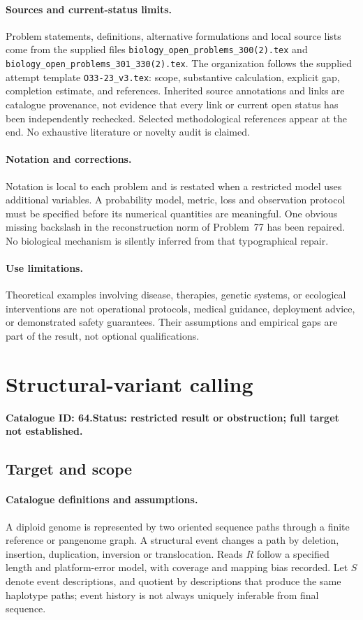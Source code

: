 \documentclass[11pt]{article}
\begin{document}
\paragraph{Sources and current-status limits.}
Problem statements, definitions, alternative formulations and local source lists
come from the supplied files
\texttt{biology\_open\_problems\_300(2).tex} and
\texttt{biology\_open\_problems\_301\_330(2).tex}.
The organization follows the supplied attempt template
\texttt{O33-23\_v3.tex}: scope, substantive calculation, explicit gap,
completion estimate, and references. Inherited source annotations and links are
catalogue provenance, not evidence that every link or current open status has
been independently rechecked. Selected methodological references appear at the
end. No exhaustive literature or novelty audit is claimed.

\paragraph{Notation and corrections.}
Notation is local to each problem and is restated when a restricted model uses
additional variables. A probability model, metric, loss and observation protocol
must be specified before its numerical quantities are meaningful. One obvious
missing backslash in the reconstruction norm of Problem~77 has been repaired.
No biological mechanism is silently inferred from that typographical repair.

\paragraph{Use limitations.}
Theoretical examples involving disease, therapies, genetic systems, or ecological
interventions are not operational protocols, medical guidance, deployment advice,
or demonstrated safety guarantees. Their assumptions and empirical gaps are part
of the result, not optional qualifications.

\setcounter{section}{63}
\section{Structural-variant calling}
\label{prob:064}
\noindent\textbf{Catalogue ID: 64.}\quad \textbf{Status: restricted result or obstruction; full target not established.}
\subsection{Target and scope}
\paragraph{Catalogue definitions and assumptions.}
A diploid genome is represented by two oriented sequence paths through a finite reference or pangenome graph. A structural event changes a path by deletion, insertion, duplication, inversion or translocation. Reads $R$ follow a specified length and platform-error model, with coverage and mapping bias recorded. Let $S$ denote event descriptions, and quotient by descriptions that produce the same haplotype paths; event history is not always uniquely inferable from final sequence.
\end{document}
